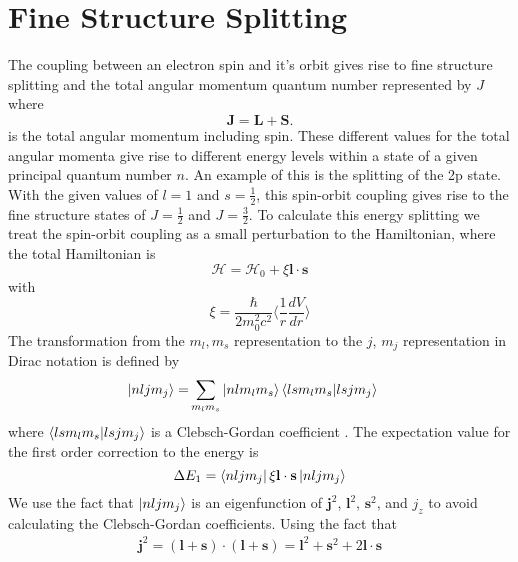 \section{Fine Structure Splitting}
The coupling between an electron spin and it's orbit gives rise to fine structure splitting and the total angular momentum quantum number represented by $J$ where
	\begin{equation}
	     \textbf{J}= \textbf{L}+ \textbf{S}.
	\end{equation}
	 is the total angular momentum including spin. These different values for the total angular momenta give rise to different energy levels within a state of a given principal quantum number $n$. An example of this is the splitting of the 2p state. With the given values of \(l=1\) and \(s=\frac{1}{2}\), this spin-orbit coupling gives rise to the fine structure states of \(J=\frac{1}{2}\) and \(J=\frac{3}{2}\). To calculate this energy splitting we treat the spin-orbit coupling as a small perturbation to the Hamiltonian, where the total Hamiltonian is \cite{woodgate2}
	 \begin{equation}
	     \mathscr{H}= \mathscr{H}_0 +\xi\textbf{l}\cdot\textbf{s}
	 \end{equation}
	 with
	 \begin{equation}
	     \xi=\frac{\hbar}{2m_0^2 c^2} \Big \langle{\frac{1}{r}\frac{dV}{dr}}\Big \rangle
	 \end{equation}
	 The transformation from the \(m_l, m_s\) representation to the $j$, $m_j$ representation in Dirac notation is defined by
	     \begin{align}
	     \ket{nljm_j}=&\sum_{m_lm_s}\ket{nlm_lm_s}
	     \braket{lsm_lm_s}{lsjm_j}
	     \end{align}
    where $\braket{lsm_lm_s}{lsjm_j}$ is a Clebsch-Gordan coefficient \cite{edmonds2}. The expectation value for the first order correction to the energy is \cite{woodgate2}
    \begin{equation}
        \Delta E_1=\bra{nljm_j}\xi\textbf{l}\cdot\textbf{s}\ket{nljm_j}
    \end{equation}
    We use the fact that $\ket{nljm_j}$ is an eigenfunction of \(\textbf{j}^2\), \(\textbf{l}^2\), \(\textbf{s}^2\), and \(j_z\) to avoid calculating the Clebsch-Gordan coefficients. Using the fact that
    \begin{align}
        \textbf{j}^2=(\textbf{l}+\textbf{s})\cdot(\textbf{l}+\textbf{s})
        =\textbf{l}^2+\textbf{s}^2+2\textbf{l}\cdot\textbf{s}
    \end{align}
